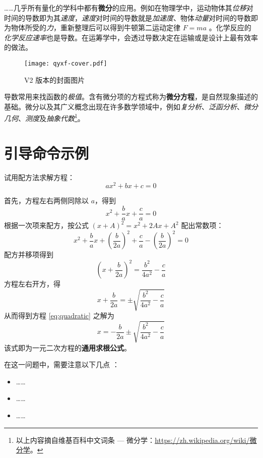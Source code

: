 ……几乎所有量化的学科中都有\textbf{微分}的应用。例如在物理学中，运动物体其\emph{位移}对时间的导数即为其\emph{速度}，\emph{速度}对时间的导数就是\emph{加速度}、物体\emph{动量}对时间的导数即为物体所受的\emph{力}，重新整理后可以得到牛顿第二运动定律 $F=ma$ 。化学反应的\emph{化学反应速率}也是导数。在运筹学中，会透过导数决定在运输或是设计上最有效率的做法。

\begin{figure}[htbp]
	\centering
	\texttt{[image: qyxf-cover.pdf]}
	\caption{V2 版本的封面图片}
	\label{fig:qyxf-logo}
\end{figure}

导数常用来找函数的\emph{极值}。含有微分项的方程式称为\textbf{微分方程}，是自然现象描述的基础。微分以及其广义概念出现在许多数学领域中，例如\emph{复分析}、\emph{泛函分析}、\emph{微分几何}、\emph{测度}及\emph{抽象代数}\footnote{以上内容摘自维基百科中文词条 --- 微分学：\url{https://zh.wikipedia.org/wiki/微分学}。}。

\section{引导命令示例}

 试用配方法求解方程：
\begin{equation}\label{eq:quadratic}
	ax^2 + bx + c = 0
\end{equation}

\solve 首先，方程左右两侧同除以 $a$，得到
\[ x^2 + \frac bax + \frac ca = 0 \]
根据一次项来配方，按公式 $(x+A)^2=x^2+2Ax+A^2$ 配出常数项：
\[ x^2 + \frac bax + \left(\frac b{2a}\right)^2 + \frac ca - \left(\frac b{2a}\right)^2 = 0 \]
配方并移项得到
\[ \left(x + \frac b{2a}\right)^2 = \frac {b^2}{4a^2} - \frac ca \]
方程左右开方，得
\[ x + \frac b{2a} = \pm \sqrt{\frac {b^2}{4a^2} - \frac ca} \]
从而得到方程 \eqref{eq:quadratic} 之解为
\begin{equation}
	x = - \frac b{2a} \pm \sqrt{\frac {b^2}{4a^2} - \frac ca}
\end{equation}
该式即为一元二次方程的\textbf{通用求根公式}。


\analysis 在这一问题中，需要注意以下几点 \cite{texbook,latex}：
\begin{itemize}
	\item ……
	\item ……
	\item ……
\end{itemize}


